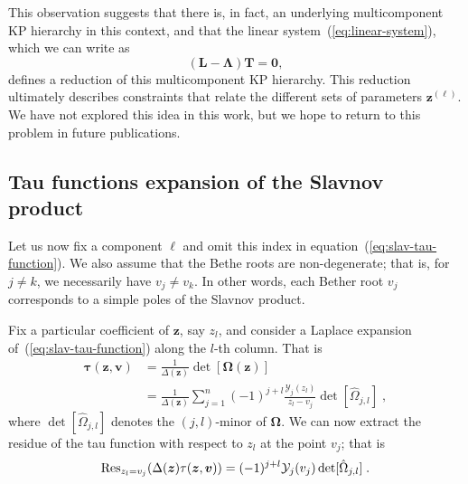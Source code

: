 \documentclass[a4paper,12pt]{amsart}
\begin{document}
\begin{conjecture}
This observation suggests that there is, in fact, an
underlying multicomponent KP hierarchy in this context, and that the
linear system~(\ref{eq:linear-system}), which we can write as
\begin{equation}
\left( \bm{L} - \bm{\Lambda} \right) \bm{T} = \bm{0},
\end{equation}
defines a reduction of this multicomponent KP hierarchy. This
reduction ultimately describes constraints that relate the different
sets of parameters \(\bm{z}^{(\ell)}\).  We have not explored this
idea in this work, but we hope to return to this problem in future
publications.
\end{conjecture}


\subsection{Tau functions expansion of the Slavnov product}

Let us now fix a component \(\ell\) and omit this index in
equation~(\ref{eq:slav-tau-function}). We also assume that the Bethe
roots are non-degenerate; that is, for \(j \neq k\), we necessarily
have \(v_j \neq v_k\). In other words, each Bether root \(v_j\)
corresponds to a simple poles of the Slavnov product.

Fix a particular coefficient of \(\bm{z}\), say \(z_l\), and consider a Laplace
expansion of~(\ref{eq:slav-tau-function}) along the \(l\)-th column. That is
\begin{equation}
\label{eq:minor-expansion}
\begin{split}
  \bm{\tau}(\bm{z}, \bm{v})
  & = \frac{1}{\Delta(\bm{z})} \det[\bm{\Omega}(\bm{z}) ] \\
  & = \frac{1}{\Delta(\bm{z})} \sum_{j=1}^n (-1)^{j + l} \frac{\mathcal{Y}_j(z_l)}{z_l - v_j  } 
  \det[\hat{\Omega}_{j, l}]\; ,
\end{split}
\end{equation}
where \(\det[\hat{\Omega}_{j,l}]\) denotes the \((j, l)\)-minor of
\(\bm{\Omega}\). We can now extract the residue of the tau function
with respect to \(z_l\) at the point \(v_j\); that is
\begin{equation}
  \operatorname{Res}_{z_l=v_j}(\Delta(\bm{z})\tau(\bm{z}, \bm{v})) = (-1)^{j+l} \mathcal{Y}_j(v_j) \det[\hat{\Omega}_{j, l}]\;. 
\end{equation}
\end{document}
